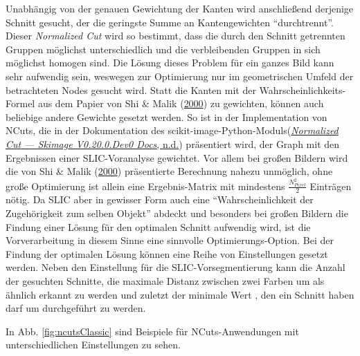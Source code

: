 \documentclass[
  12pt,
]{book}
\begin{document}
Unabhängig von der genauen Gewichtung der Kanten wird anschließend derjenige Schnitt gesucht, der die geringste Summe an Kantengewichten ``durchtrennt''. Dieser \emph{Normalized Cut} wird so bestimmt, dass die durch den Schnitt getrennten Gruppen möglichst unterschiedlich und die verbleibenden Gruppen in sich möglichst homogen sind. Die Lösung dieses Problem für ein ganzes Bild kann sehr aufwendig sein, weswegen zur Optimierung nur im geometrischen Umfeld der betrachteten Nodes gesucht wird.
Statt die Kanten mit der Wahrscheinlichkeits-Formel aus dem Papier von Shi \& Malik (\protect\hyperlink{ref-shiNormalizedCutsImage2000}{2000}) zu gewichten, können auch beliebige andere Gewichte gesetzt werden. So ist in der Implementation von NCuts, die in der Dokumentation des scikit-image-Python-Moduls(\protect\hyperlink{ref-NormalizedCutSkimage}{\emph{Normalized {Cut} --- Skimage V0.20.0.Dev0 Docs}, n.d.}) präsentiert wird, der Graph mit den Ergebnissen einer SLIC-Voranalyse gewichtet. Vor allem bei großen Bildern wird die von Shi \& Malik (\protect\hyperlink{ref-shiNormalizedCutsImage2000}{2000}) präsentierte Berechnung nahezu unmöglich, ohne große Optimierung ist allein eine Ergebnis-Matrix mit mindestens \(\frac{N_{Pixel}^2}{2}\) Einträgen nötig.
Da SLIC aber in gewisser Form auch eine ``Wahrscheinlichkeit der Zugehörigkeit zum selben Objekt'' abdeckt und besonders bei großen Bildern die Findung einer Lösung für den optimalen Schnitt aufwendig wird, ist die Vorverarbeitung in diesem Sinne eine sinnvolle Optimierungs-Option.
Bei der Findung der optimalen Lösung können eine Reihe von Einstellungen gesetzt werden. Neben den Einstellung für die SLIC-Vorsegmentierung kann die Anzahl der gesuchten Schnitte, die maximale Distanz zwischen zwei Farben um als ähnlich erkannt zu werden und zuletzt der minimale Wert , den ein Schnitt haben darf um durchgeführt zu werden.

In Abb. \ref{fig:ncutsClassic} sind Beispiele für NCuts-Anwendungen mit unterschiedlichen Einstellungen zu sehen.
\end{document}
